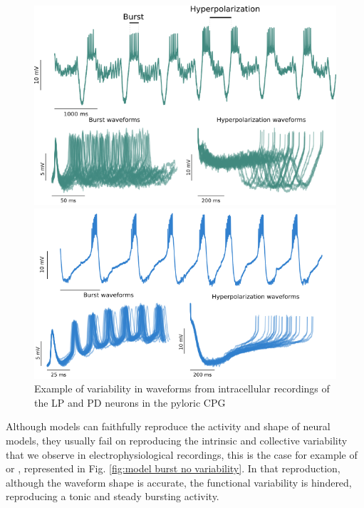 \begin{figure}[hbt]
	\centering
	\begin{minipage}{0.48\textwidth}
		\includegraphics[width=\textwidth]{img/invariants/variability/lp_burst_variability.png}
	\end{minipage}
	\begin{minipage}{0.48\textwidth}
		\includegraphics[width=\textwidth]{img/invariants/variability/pd_burst_variability.png}
	\end{minipage}
	\caption{Example of variability in waveforms from intracellular recordings of the LP and PD neurons in the pyloric CPG}
	\label{fig:lp-pd burst variability}
\end{figure}

Although models can faithfully reproduce the activity and shape of neural models, they usually fail on reproducing the intrinsic and collective variability that we observe in electrophysiological recordings, this is the case for example of \textcite{hodgkin_quantitative_1952} or \textcite{vavoulis_dynamic_2007}, represented in Fig. \ref{fig:model burst no variability}. In that reproduction, although the waveform shape is accurate, the functional variability is hindered, reproducing a tonic and steady bursting activity. 

